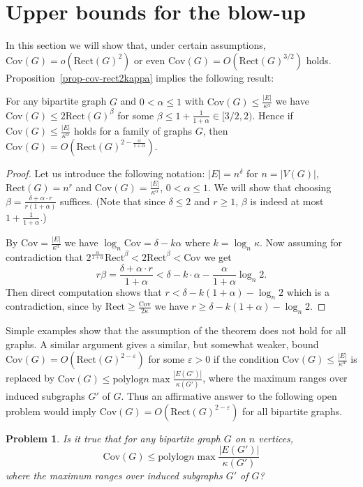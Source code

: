 \documentclass[submission]{llncs}
\def\Cov{{\mathrm{Cov}}}
\def\Rect{{\mathrm{Rect}}}
\def\polylog{{\mathrm{polylog}}}
\newtheorem{openproblem}{Problem}
\begin{document}
\section{Upper bounds for the blow-up}
\label{sec-setcover}
In this section we will show that, under certain assumptions, $\Cov(G)=o(\Rect(G)^2)$ or even $\Cov(G) = O(\Rect(G)^{3/2})$ holds.
Proposition~\ref{prop-cov-rect2kappa} implies the following result:
\begin{theorem} \label{thm:feltetel}
  For any bipartite graph $G$ and $0<\alpha\le1$ with $\Cov(G)\leq\frac{|E|}{\kappa^\alpha}$ we have
$\Cov(G)\leq 2\Rect(G)^{\beta}$ for some $\beta\leq 1+\frac{1}{1+\alpha}\in[3/2,2)$.
  Hence if $\Cov(G)\leq \frac{|E|}{\kappa^\alpha}$ holds for a family of graphs $G$, then
  $\Cov(G)=O(\Rect(G)^{2-\frac{\alpha}{1+\alpha}})$.
\end{theorem}
  \begin{proof}
Let us introduce the following notation: $|E|=n^\delta$ for $n=|V(G)|$, $\Rect(G)=n^r$ and $\Cov(G)=\frac{|E|}{\kappa^\alpha}$, $0<\alpha\le1$.
  We will show that 
  choosing $\beta=\frac{\delta+\alpha\cdot r}{r(1+\alpha)}$ suffices. (Note that since $\delta\leq 2$ and $r\geq 1$, $\beta$ is indeed at most 
  $1+\frac{1}{1+\alpha}$.)


  By $\Cov=\frac{|E|}{\kappa^\alpha}$ we have $\log_n\Cov = \delta-k\alpha$ where $k=\log_n\kappa$.
  Now assuming for contradiction that $2^{\frac{\alpha}{1+\alpha}}\Rect^\beta<2\Rect^\beta<\Cov$ we get
  \[r\beta=\frac{\delta+\alpha\cdot r}{1+\alpha}<\delta-k\cdot \alpha-\frac{\alpha}{1+\alpha}\log_n 2.\]
Then direct computation shows that
$r<\delta-k(1+\alpha)-\log_n 2$
  which is a contradiction, since by $\Rect\geq \frac{\Cov}{2\kappa}$ we have $r\geq \delta-k(1+\alpha)-\log_n 2$.
\end{proof}
  Simple examples show that the assumption of the theorem does not hold for all graphs.
  A similar argument gives a similar, but somewhat weaker, bound $\Cov(G)=O(\Rect(G)^{2-\varepsilon})$ for some $\varepsilon>0$
  if the condition $\Cov(G)\leq\frac{|E|}{\kappa^\alpha}$ is replaced by $\Cov(G)\leq \polylog n \max\frac{|E(G')|}{\kappa(G')}$,
  where the maximum ranges over induced subgraphs $G'$ of $G$.
  Thus an affirmative answer to the following open problem would imply $\Cov(G)=O(\Rect(G)^{2-\varepsilon})$ for all bipartite graphs.
  \begin{openproblem}
  Is it true that for any bipartite graph $G$ on $n$ vertices,
  \[\Cov(G)\leq \polylog n \max\frac{|E(G')|}{\kappa(G')}\]
  where the maximum ranges over induced subgraphs $G'$ of $G$?
  \end{openproblem}
\end{document}
